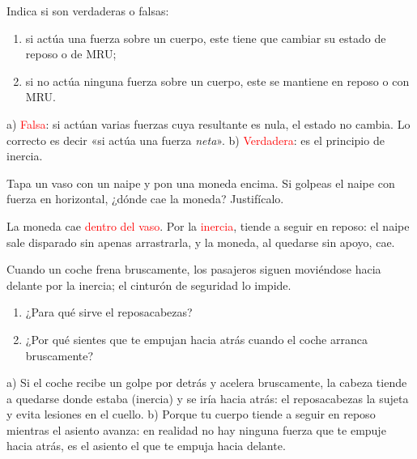 \begin{exercise}
    Indica si son verdaderas o falsas:
    \begin{enumerate}[label=\alph*)]
        \item si actúa una fuerza sobre un cuerpo, este tiene que cambiar su estado de reposo o de MRU;
        \item si no actúa ninguna fuerza sobre un cuerpo, este se mantiene en reposo o con MRU.
    \end{enumerate}
    \begin{solu}
        a) \textcolor{red}{Falsa}: si actúan varias fuerzas cuya resultante es nula, el estado no cambia. Lo correcto es decir «si actúa una fuerza \emph{neta}». b) \textcolor{red}{Verdadera}: es el principio de inercia.
    \end{solu}
\end{exercise}

\begin{exercise}
    Tapa un vaso con un naipe y pon una moneda encima. Si golpeas el naipe con fuerza en horizontal, ¿dónde cae la moneda? Justifícalo.
    \begin{solu}
        La moneda cae \textcolor{red}{dentro del vaso}. Por la \textcolor{red}{inercia}, tiende a seguir en reposo: el naipe sale disparado sin apenas arrastrarla, y la moneda, al quedarse sin apoyo, cae.
    \end{solu}
\end{exercise}

\begin{exercise}
    Cuando un coche frena bruscamente, los pasajeros siguen moviéndose hacia delante por la inercia; el cinturón de seguridad lo impide.
    \begin{enumerate}[label=\alph*)]
        \item ¿Para qué sirve el reposacabezas?
        \item ¿Por qué sientes que te empujan hacia atrás cuando el coche arranca bruscamente?
    \end{enumerate}
    \begin{solu}
        a) Si el coche recibe un golpe por detrás y acelera bruscamente, la cabeza tiende a quedarse donde estaba (inercia) y se iría hacia atrás: el reposacabezas la sujeta y evita lesiones en el cuello. b) Porque tu cuerpo tiende a seguir en reposo mientras el asiento avanza: en realidad no hay ninguna fuerza que te empuje hacia atrás, es el asiento el que te empuja hacia delante.
    \end{solu}
\end{exercise}

